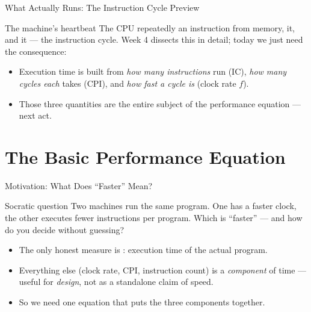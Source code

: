\documentclass[aspectratio=169]{beamer}
\begin{document}
\begin{frame}{What Actually Runs: The Instruction Cycle Preview}
  \begin{block}{The machine's heartbeat}
    The CPU repeatedly  an instruction from memory, 
    it, and  it --- the instruction cycle. Week 4 dissects this
    in detail; today we just need the consequence:
  \end{block}
  \begin{itemize}
    \item Execution time is built from \emph{how many instructions} run
      ($\text{IC}$), \emph{how many cycles each} takes ($\text{CPI}$), and
      \emph{how fast a cycle is} (clock rate $f$).
    \item Those three quantities are the entire subject of the performance
      equation --- next act.
  \end{itemize}
\end{frame}


\section{The Basic Performance Equation}

\begin{frame}{Motivation: What Does ``Faster'' Mean?}
  \begin{block}{Socratic question}
    Two machines run the same program. One has a faster clock, the other
    executes fewer instructions per program. Which is ``faster'' --- and how
    do you decide without guessing?
  \end{block}
  \begin{itemize}
    \item The only honest measure is : execution time of the actual
      program.
    \item Everything else (clock rate, CPI, instruction count) is a
      \emph{component} of time --- useful for \emph{design}, not as a
      standalone claim of speed.
    \item So we need one equation that puts the three components together.
  \end{itemize}
\end{frame}
\end{document}
